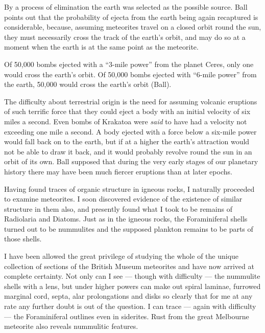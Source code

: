 \documentclass[a4paper, 12pt, oneside, landscape]{article}
\begin{document}
By a process of elimination the earth was selected as the possible source. Ball points out that the probability of ejecta from the earth being again recaptured is considerable, because, assuming meteorites travel on a closed orbit round the sun, they must necessarily cross the track of the earth's orbit, and may do so at a moment when the earth is at the same point as the meteorite.

Of 50,000 bombs ejected with a ``3-mile power'' from the planet Ceres, only one would cross the earth's orbit. Of 50,000 bombs ejected with ``6-mile power'' from the earth, 50,000 would cross the earth's orbit (Ball).

The difficulty about terrestrial origin is the need for assuming volcanic eruptions of such terrific force that they could eject a body with an initial velocity of six miles a second. Even bombs of Krakatoa were \emph{said} to have had a velocity not exceeding one mile a second. A body ejected with a force below a six-mile power would fall back on to the earth, but if at a higher the earth's attraction would not be able to draw it back, and it would probably revolve round the sun in an orbit of its own. Ball supposed that during the very early stages of our planetary history there may have been much fiercer eruptions than at later epochs.

Having found traces of organic structure in igneous rocks, I naturally proceeded to examine meteorites. I soon discovered evidence of the existence of similar structure in them also, and presently found what I took to be remains of Radiolaria and Diatoms. Just as in the igneous rocks, the Foraminiferal shells turned out to be nummulites and the supposed plankton remains to be parts of those shells.

I have been allowed the great privilege of studying the whole of the unique collection of sections of the British Museum meteorites and have now arrived at complete certainty. Not only can I see --- though with difficulty --- the nummulite shells with a lens, but under higher powers can make out spiral laminae, furrowed marginal cord, septa, alar prolongations and disks so clearly that for me at any rate any further doubt is out of the question. I can trace --- again with difficulty --- the Foraminiferal outlines even in siderites. Rust from the great Melbourne meteorite also reveals nummulitic features.
\end{document}
